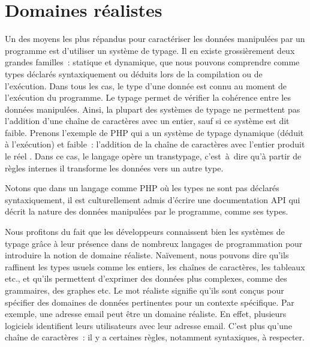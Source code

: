 \section{Domaines réalistes}
\label{section:language:realdoms}

Un des moyens les plus répandus pour caractériser les données manipulées par un
programme est d'utiliser un système de {\strong typage}. Il en existe
grossièrement deux grandes familles~: {\strong statique} et {\strong dynamique},
que nous pouvons comprendre comme types déclarés syntaxiquement ou déduits lors
de la compilation ou de l'exécution. Dans tous les cas, le type d'une donnée est
connu au moment de l'{\strong exécution} du programme. Le typage permet de
{\strong vérifier} la cohérence entre les données manipulées. Ainsi, la plupart
des systèmes de typage ne permettent pas l'addition d'une chaîne de caractères
avec un entier, sauf si ce système est dit {\strong faible}. Prenons l'exemple
de PHP qui a un système de typage dynamique (déduit à l'exécution) et faible~:
l'addition de la chaîne de caractères  avec l'entier 
produit le réel . Dans ce cas, le langage opère un transtypage,
c'est~à~dire qu'à partir de règles internes il transforme les données vers un
autre type.

Notons que dans un langage comme PHP où les types ne sont pas déclarés
syntaxiquement, il est culturellement admis d'écrire une documentation API qui
décrit la nature des données manipulées par le programme, comme ses types.

Nous profitons du fait que les développeurs connaissent bien les systèmes de
typage grâce à leur présence dans de nombreux langages de programmation pour
introduire la notion de {\strong domaine réaliste}. Naïvement, nous pouvons dire
qu'ils raffinent les types usuels comme les entiers, les chaînes de caractères,
les tableaux etc., et qu'ils permettent d'exprimer des données plus complexes,
comme des grammaires, des graphes etc. Le mot {\strong réaliste} signifie qu'ils
sont conçus pour spécifier des domaines de données {\strong pertinentes} pour un
contexte {\strong spécifique}. Par exemple, une adresse email peut être un
domaine réaliste. En effet, plusieurs logiciels identifient leurs utilisateurs
avec leur adresse email. C'est plus qu'une chaîne de caractères~: il y a
certaines règles, notamment syntaxiques, à respecter.


